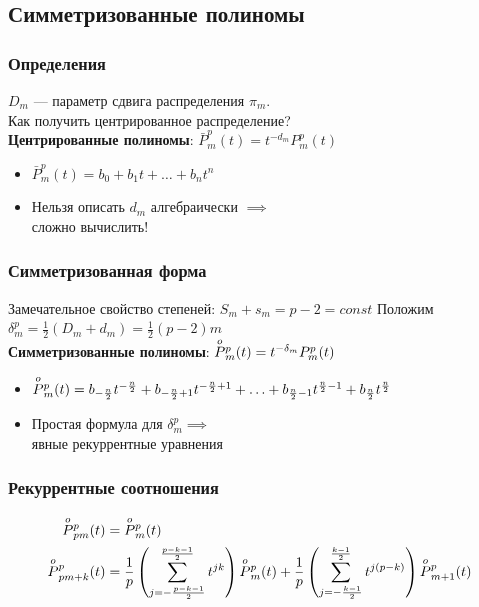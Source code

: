 \subsection{Симметризованные полиномы}
\begin{frame}
\frametitle{Определения}
$D_m$ --- параметр сдвига распределения $\pi_m$.\\
Как получить центрированное распределение?
\bigskip\\
\textbf{Центрированные полиномы}: $\bar{P}_m^p(t) = t^{-d_m}P_m^p(t)$
\begin{itemize}
\item $\bar{P}_m^p(t) = b_0 + b_1 t + \ldots + b_n t^n$
\item Нельзя описать $d_m$ алгебраически $\implies$ \\сложно вычислить!
\end{itemize}
\end{frame}

\begin{frame}
\frametitle{Симметризованная форма}
Замечательное свойство степеней: $S_m + s_m = p-2 = const$
Положим $\delta_m^p = \frac{1}{2}(D_m + d_m) = \frac{1}{2}(p-2)m$
\bigskip\\
\textbf{Симметризованные полиномы}: $\overset{o}{P}{}^{p}_{m}(t) = t^{-\delta_m}P_m^p(t)$
\begin{itemize}
\item $\overset{o}{P}{}^{p}_{m}(t) = b_{-\frac{n}{2}}t^{-\frac{n}{2}} + b_{-\frac{n}{2}+1} t^{-\frac{n}{2} + 1} + \ldots + b_{\frac{n}{2}-1} t^{\frac{n}{2} - 1} + b_{\frac{n}{2}}t^{\frac{n}{2}}$
\item Простая формула для $\delta_m^p \implies$\\
явные рекуррентные уравнения
\end{itemize}
\end{frame}

\begin{frame}
\frametitle{Рекуррентные соотношения}
\begin{align*}
    \overset{o}{P}{}^{p}_{pm}(t)&=\overset{o}{P}{}^{p}_{m}(t)\\
    \overset{o}{P}{}^{p}_{pm+k}(t)&=\frac{1}{p}\left(\sum\limits_{j=-\frac{p-k-1}{2}}^{\frac{p-k-1}{2}} t^{jk}\right)\overset{o}{P}{}^{p}_{m}(t)+\frac{1}{p}\left(\sum\limits_{j=-\frac{k-1}{2}}^\frac{k-1}{2} t^{j(p-k)}\right)\overset{o}{P}{}^{p}_{m+1}(t)
\end{align*}
\end{frame}

